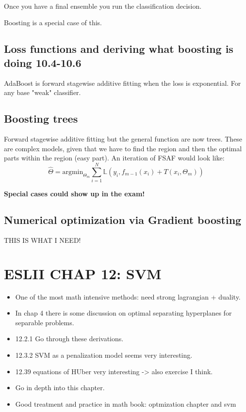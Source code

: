 \documentclass{article}
\begin{document}
Once you have a final ensemble you run the classification decision.


Boosting is a special case of this.

\subsection*{Loss functions and deriving what boosting is doing 10.4-10.6}

AdaBoost is forward stagewise additive fitting when the loss is exponential. For any base "weak" classifier.

\subsection*{Boosting trees}
Forward stagewise additive fitting but the general function are now trees. These are complex models, given that we have to find the region and
then the optimal parts within the region (easy part).
An iteration of FSAF would look like: $$\hat{\Theta} = \text{argmin}_{\Theta_m} \sum_{i=1}^{N}\mathbb{L} (y_i,f_{m-1}(x_i) + T(x_i, \Theta_m))$$


\textbf{Special cases could show up in the exam!}

\subsection*{Numerical optimization via Gradient boosting}
THIS IS WHAT I NEED!

\section*{ESLII CHAP 12: SVM}
\begin{itemize}
    \item One of the most math intensive methods: need strong lagrangian + duality.
    \item In chap 4 there is some discussion on optimal separating hyperplanes for separable problems.
    \item 12.2.1 Go through these derivations.
    \item 12.3.2 SVM as a penalization model seems very interesting.
    \item 12.39 equations of HUber very interesting -> also exercise I think.
    \item Go in depth into this chapter.
    \item Good treatment and practice in math book: optmization chapter and svm
\end{itemize}
\end{document}
